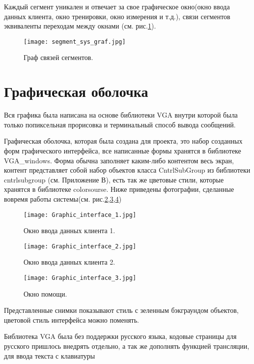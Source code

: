 Каждый сегмент уникален и отвечает за свое графическое окно(окно ввода данных клиента, окно тренировки, окно измерения и т.д.), связи сегментов эквиваленты переходам между окнами (см. рис.\ref{fig:segment_sys_graf}).
\begin{figure}[ht]
	\centering
     \texttt{[image: segment\_sys\_graf.jpg]}
	\caption{Граф связей сегментов.}
	\label{fig:segment_sys_graf}
\end{figure}

\section{Графическая оболочка}

Вся графика была написана на основе библиотеки VGA внутри которой была только попиксельная прорисовка и терминальный способ вывода сообщений.

Графическая оболочка, которая была создана для проекта, это набор созданных форм графического интерфейса, все написанные формы хранятся в библиотеке VGA\_windows. Форма обычна заполняет каким-либо контентом весь экран, контент представляет собой набор объектов класса CntrlSubGroup из библиотеки cntrlsubgroup (см. Приложение В), есть так же цветовые стили, которые хранятся в библиотеке colorsourse. Ниже приведены фотографии, сделанные вовремя работы системы(см. рис.\ref{fig:Graphic_interface_1},\ref{fig:Graphic_interface_2},\ref{fig:Graphic_interface_3})


\begin{figure}[ht]
	\centering
     \texttt{[image: Graphic\_interface\_1.jpg]}
	\caption{Окно ввода данных клиента 1.}
	\label{fig:Graphic_interface_1}
\end{figure}
\begin{figure}[ht]
	\centering
     \texttt{[image: Graphic\_interface\_2.jpg]}
	\caption{Окно ввода данных клиента 2.}
	\label{fig:Graphic_interface_2}
\end{figure}
\begin{figure}[ht]
	\centering
     \texttt{[image: Graphic\_interface\_3.jpg]}
	\caption{Окно помощи.}
	\label{fig:Graphic_interface_3}
\end{figure}

Представленные снимки показывают стиль с зеленным бэкграундом объектов, цветовой стиль интерфейса можно поменять.

Библиотека VGA была без поддержки русского языка, кодовые страницы для русского пришлось внедрять отдельно, а так же дополнять функцией трансляции, для ввода текста с клавиатуры

